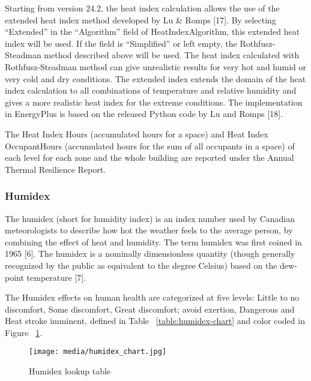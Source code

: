 Starting from version 24.2, the heat index calculation allows the use of the extended heat
index method developed by Lu \& Romps [17]. By selecting ``Extended'' in the ``Algorithm''
field of HeatIndexAlgorithm, this extended heat index will be used. If the field is
``Simplified'' or left empty, the Rothfusz-Steadman method described above will be used.
The heat index calculated with Rothfusz-Steadman method can give
unrealistic results for very hot and humid or very cold and dry conditions. The
extended index extends the domain of the heat index calculation to all
combinations of temperature and relative humidity and gives a more realistic heat
index for the extreme conditions. The implementation in EnergyPlus is based on
the released Python code by Lu and Romps [18].

The Heat Index Hours (accumulated hours for a space) and Heat Index
OccupantHours (accumulated hours for the sum of all occupants in a space) of
each level for each zone and the whole building are reported under the Annual
Thermal Resilience Report.

\subsubsection{Humidex}\label{humidex}

The humidex (short for humidity index) is an index number used by Canadian
meteorologists to describe how hot the weather feels to the average person, by
combining the effect of heat and humidity. The term humidex was first coined in
1965 [6]. The humidex is a nominally dimensionless quantity (though generally
recognized by the public as equivalent to the degree Celsius) based on the
dew-point temperature [7].

The Humidex effects on human health are categorized at five levels: Little to no
discomfort, Some discomfort, Great discomfort; avoid exertion, Dangerous and
Heat stroke imminent, defined in Table ~\ref{table:humidex-chart} and color
coded in Figure ~\ref{fig:humidex-lookup-table}.

\begin{figure}[hbtp] 
\centering
\texttt{[image: media/humidex\_chart.jpg]}
\caption{Humidex lookup table \protect \label{fig:humidex-lookup-table}}
\end{figure}

